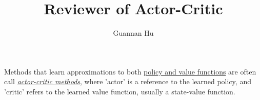 \documentclass[12pt,a4paper]{article}
\begin{document}
\title{Reviewer of Actor-Critic}
\author{Guannan Hu}
\maketitle
\paragraph{} Methods that learn approximations to both \uline{policy and value functions} are often call \textit{\uline{actor-critic methods}}, where 'actor' is a reference to the learned policy, and 'critic' refers to the learned value function, usually a state-value function.


\end{document}

